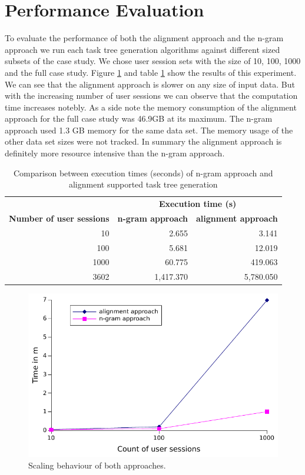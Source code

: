 \section{Performance Evaluation}
To evaluate the performance of both the alignment approach and the n-gram approach we run each task tree generation algorithms against different sized subsets of the case study.
We chose user session sets with the size of 10, 100, 1000 and the full case study. Figure \ref{fig:performance} and table \ref{tab:comparisontasktreegenerations} show the results of this experiment.
We can see that the alignment approach is slower on any size of input data.
But with the increasing number of user sessions we can observe that the computation time increases notebly.
As a side note the memory consumption of the alignment approach for the full case study was 46.9GB at its maximum.
The n-gram approach used 1.3 GB memory for the same data set.
The memory usage of the other data set sizes were not tracked.
In summary the alignment approach is definitely more resource intensive than the n-gram approach.
\begin{table}[h]
	\centering
	\begin{tabular}{ r r r }
		\toprule
		& \multicolumn{2}{c}{\textbf{Execution time (s)}} \\
		\cmidrule{2-3}
		\textbf{Number of user sessions} & \textbf{n-gram approach} & \textbf{alignment approach} \\
		\midrule
		10 	& 2.655	& 3.141\\
		100 	& 5.681	& 12.019\\
		1000 	& 60.775	& 419.063\\
		\midrule
		3602 	& 1,417.370 & 5,780.050\\
		\bottomrule
	\end{tabular}
	\caption{Comparison between execution times (seconds) of n-gram approach and alignment supported task tree generation}
	\label{tab:comparisontasktreegenerations}
\end{table}


 \begin{figure}[h]
	\centering
	\includegraphics[]{chapters/casestudy/performance.pdf}
	\caption{Scaling behaviour of both approaches.}
	\label{fig:performance}
\end{figure}


